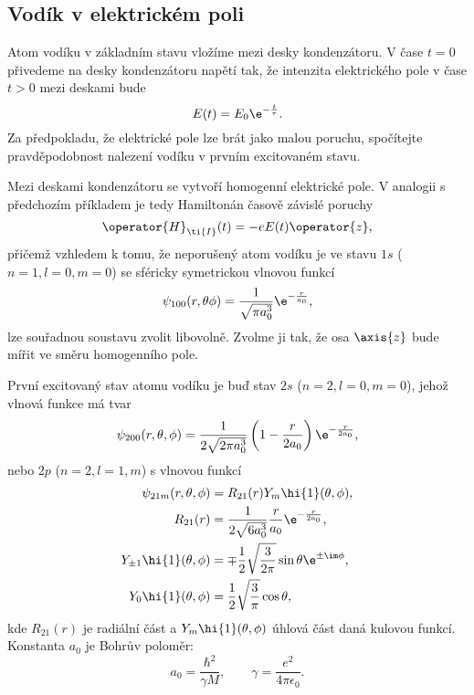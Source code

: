 \subsection{Vodík v elektrickém poli}
Atom vodíku v základním stavu vložíme mezi desky kondenzátoru.
V čase $t=0$ přivedeme na desky kondenzátoru napětí tak, že intenzita elektrického pole v čase $t>0$ mezi deskami bude
\begin{equation}
    E(t)=E_0\e^{-\frac{t}{\tau}}.
\end{equation}
Za předpokladu, že elektrické pole lze brát jako malou poruchu, spočítejte pravděpodobnost nalezení vodíku v prvním excitovaném stavu.
	
\begin{solution}
    Mezi deskami kondenzátoru se vytvoří homogenní elektrické pole.
    V analogii s předchozím příkladem je tedy Hamiltonán časově závislé poruchy 
    \begin{equation}
        \operator{H}_{\ti{I}}(t)=-eE(t)\operator{z},
    \end{equation}
    přičemž vzhledem k tomu, že neporušený atom vodíku je ve stavu $1s$ ($n=1, l=0, m=0$) se sféricky symetrickou vlnovou funkcí
    \begin{equation}
        \psi_{100}(r,\theta\phi)=\frac{1}{\sqrt{\pi a_{0}^{3}}}\e^{-\frac{r}{a_{0}}},
    \end{equation}
    lze souřadnou soustavu zvolit libovolně.
    Zvolme ji tak, že osa $\axis{z}$ bude mířit ve směru homogenního pole.

    První excitovaný stav atomu vodíku je buď stav $2s$ ($n=2, l=0, m=0$), jehož vlnová funkce má tvar
    \begin{equation}
        \psi_{200}(r,\theta,\phi)=\frac{1}{2\sqrt{2\pi a_{0}^{3}}}\left(1-\frac{r}{2a_{0}}\right)\e^{-\frac{r}{2a_{0}}},
    \end{equation}
    nebo $2p$ ($n=2, l=1, m$) s vlnovou funkcí
    \begin{subequations}
        \begin{align}
            \psi_{21m}(r,\theta,\phi)&=R_{21}(r)Y_{m}\hi{1}(\theta,\phi),\\
            R_{21}(r)&=\frac{1}{2\sqrt{6a_{0}^{3}}}\frac{r}{a_{0}}\e^{-\frac{r}{2a_{0}}},\\
            Y_{\pm1}\hi{1}(\theta,\phi)&=\mp\frac{1}{2}\sqrt{\frac{3}{2\pi}}\sin{\theta}\e^{\pm\im\phi},\\
            Y_{0}\hi{1}(\theta,\phi)&=\frac{1}{2}\sqrt{\frac{3}{\pi}}\cos{\theta},
        \end{align}            
    \end{subequations}
    kde $R_{21}(r)$ je radiální část a $Y_{m}\hi{1}(\theta,\phi)$ úhlová část daná kulovou funkcí.
    Konstanta $a_{0}$ je Bohrův poloměr:
    \begin{equation}
        a_{0}=\frac{\hbar^{2}}{\gamma M},\qquad \gamma=\frac{e^{2}}{4\pi\epsilon_{0}}.
    \end{equation}


\end{solution}
